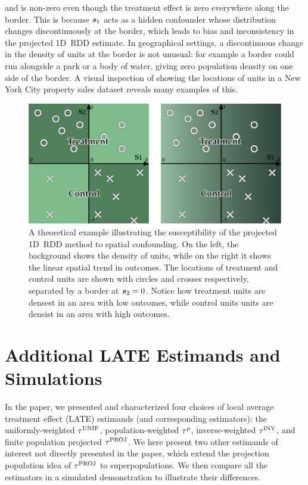 and is non-zero even though the treatment effect is zero everywhere along the border.
This is because \(\bm{s}_1\) acts as a hidden confounder whose distribution changes discontinuously at the border, which leads to bias and inconsistency in the projected 1D~RDD estimate.
In geographical settings, a discontinuous change in the density of units at the border is not unusual: for example a border could run alongside a park or a body of water, giving zero population density on one side of the border.
A visual inspection of  showing the locations of units in a New York City property sales dataset reveals many examples of this.

\begin{figure}[tb]
    \centering
    \includegraphics[height=0.3\textheight]{figures/confounding/confounding.pdf}
    \caption{
        A theoretical example illustrating the susceptibility of the projected 1D~RDD method to spatial confounding. 
        On the left, the background shows the density of units, while on the right it shows the linear spatial trend in outcomes.
        The locations of treatment and control units are shown with circles and crosses respectively, separated by a border at \(\bm{s}_2 = 0\). 
        Notice how treatment units are densest in an area with low outcomes, while control units units are densist in an area with high outcomes.
        \label{fig:confounding}}
\end{figure}

\section{Additional LATE Estimands and Simulations}
\label{sec:additional_late}

	In the paper, we presented and characterized four choices of local average treatment effect (LATE) estimands (and corresponding estimators): the uniformly-weighted \(\tau^{\mathrm{UNIF}}\), population-weighted \(\tau^{\rho}\), inverse-weighted \(\tau^{\mathrm{INV}}\), and finite population projected \(\tau^{\mathrm{PROJ}}\).
We here present two other estimands of interest not directly presented in the paper, which extend the projection population idea of \(\tau^{\mathrm{PROJ}}\) to superpopulations.
We then compare all the estimators in a simulated demonstration to illustrate their differences.

